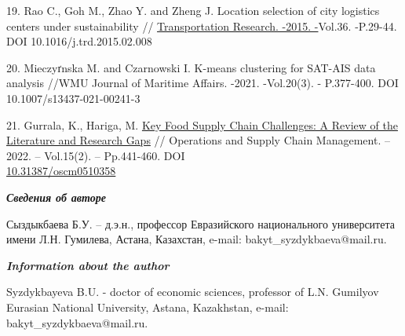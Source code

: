 \begin{references}
19. Rao C., Goh M., Zhao Y. and Zheng J. Location selection of city
logistics centers under sustainability //
\href{https://www.sciencedirect.com/journal/transportation-research-part-d-transport-and-environment}{Transportation
Research. -2015.
-}Vol.36. -P.29-44.
DOI 10.1016/j.trd.2015.02.008

20. Mieczyґnska M. and Czarnowski I. K-means clustering for SAT-AIS data
analysis //WMU Journal of Maritime Affairs. -2021. -Vol.20(3). -
P.377-400. DOI 10.1007/s13437-021-00241-3

21. Gurrala, K., Hariga, M.
\href{https://journal.oscm-forum.org/publication/article/key-food-supply-chain-challenges-a-review-of-the-literature-and-research-gaps}{Key
Food Supply Chain Challenges: A Review of the Literature and Research
Gaps} // Operations and Supply Chain Management. -- 2022. -- Vol.15(2).
-- Pp.441-460. DOI\\
\href{http://doi.org/10.31387/oscm0510358}{10.31387/oscm0510358}
\end{references}

\begin{authorinfo}
\hspace{1em}\emph{{\bfseries Сведения об авторе}}

Сыздыкбаева Б.У. -- д.э.н., профессор Евразийского национального
университета имени Л.Н. Гумилева, Астана, Казахстан, e-mail:
bakyt\_syzdykbaeva@mail.ru.

\hspace{1em}\emph{{\bfseries Information about the author}}

Syzdykbayeva B.U. - doctor of economic sciences, professor of
L.N. Gumilyov Eurasian National University, Astana, Kazakhstan, e-mail:
bakyt\_syzdykbaeva@mail.ru.
\end{authorinfo}
